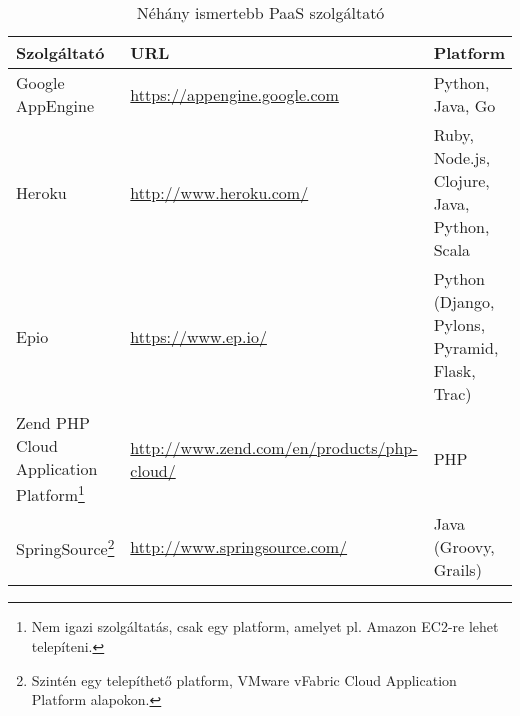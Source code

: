 \begin{table}[h]
	\caption{Néhány ismertebb PaaS szolgáltató}
	\centering
	\small
	\begin{tabular}{| p{4cm} | p{5.5cm} | p{4cm} |}
		\hline
		\rowcolor{MyTableColor} \textbf{Szolgáltató} & \textbf{URL} & \textbf{Platform} \\
		\hline
		Google AppEngine & \href{https://appengine.google.com}{https://appengine.google.com} & Python, Java, Go \\ 
		\hline
		Heroku & \href{http://www.heroku.com/}{http://www.heroku.com/} & Ruby, Node.js, Clojure, Java, Python, Scala \\
		\hline
		Epio & \href{https://www.ep.io/}{https://www.ep.io/} & Python (Django, Pylons, Pyramid, Flask, Trac) \\
		\hline
		Zend PHP Cloud Application Platform\footnote{Nem igazi szolgáltatás, csak egy platform, amelyet pl. Amazon EC2-re lehet telepíteni.} & \href{http://www.zend.com/en/products/php-cloud/}{http://www.zend.com/en/products/php-cloud/} & PHP\\
		\hline
		SpringSource\footnote{Szintén egy telepíthető platform, VMware vFabric Cloud Application Platform alapokon.} & \href{http://www.springsource.com/}{http://www.springsource.com/} & Java (Groovy, Grails)\\
		\hline
	\end{tabular}
	\normalsize
	\label{tab:paas_providers}
\end{table}

